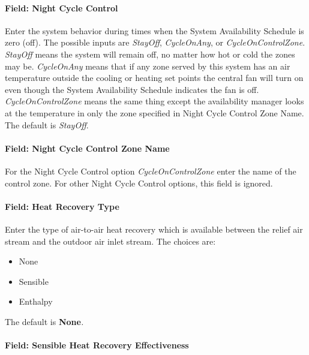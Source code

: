 \paragraph{Field: Night Cycle Control}\label{field-night-cycle-control-1}

Enter the system behavior during times when the System Availability Schedule is zero (off). The possible inputs are \emph{StayOff}, \emph{CycleOnAny}, or \emph{CycleOnControlZone}. \emph{StayOff} means the system will remain off, no matter how hot or cold the zones may be. \emph{CycleOnAny} means that if any zone served by this system has an air temperature outside the cooling or heating set points the central fan will turn on even though the System Availability Schedule indicates the fan is off. \emph{CycleOnControlZone} means the same thing except the availability manager looks at the temperature in only the zone specified in Night Cycle Control Zone Name. The default is \emph{StayOff}.

\paragraph{Field: Night Cycle Control Zone Name}\label{field-night-cycle-control-zone-name-1}

For the Night Cycle Control option \emph{CycleOnControlZone} enter the name of the control zone. For other Night Cycle Control options, this field is ignored.

\paragraph{Field: Heat Recovery Type}\label{field-heat-recovery-type-2}

Enter the type of air-to-air heat recovery which is available between the relief air stream and the outdoor air inlet stream. The choices are:

\begin{itemize}
\item
  None
\item
  Sensible
\item
  Enthalpy
\end{itemize}

The default is \textbf{None}\emph{.}

\paragraph{Field: Sensible Heat Recovery Effectiveness}\label{field-sensible-heat-recovery-effectiveness-2}

